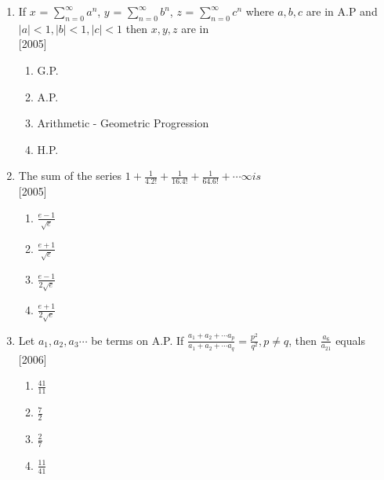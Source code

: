 \documentclass[journal,12pt,twocolumn]{IEEEtran}
\theoremstyle{remark}
\begin{document}
\begin{enumerate}[label={\arabic*.}]
\item {If $x$ = $\sum\limits_{n=0}^{\infty}a^n$, $y$ = $\sum\limits_{n=0}^{\infty}b^n$, $z$ = $\sum\limits_{n=0}^{\infty}c^n$ where $a,b,c$ are in A.P and $|a|<1,|b|<1,|c|<1$ then $x,y,z$ are in}\\ \hfill{[2005]}
\begin{enumerate}[label={(\alph*)}]
\item  {G.P.}
\item  {A.P.}
\item  {Arithmetic - Geometric Progression}
\item  {H.P.}
\end{enumerate}

\item {The sum of the series $1+\frac{1}{4.2!}+\frac{1}{16.4!}+\frac{1}{64.6!}+\cdots \infty is$}\\ \hfill{[2005]}
\begin{enumerate}[label={(\alph*)}]
\item  {$\frac{e-1}{\sqrt{e}}$}
\item  {$\frac{e+1}{\sqrt{e}}$}
\item  {$\frac{e-1}{2\sqrt{e}}$}
\item  {$\frac{e+1}{2\sqrt{e}}$}
\end{enumerate}

\item {Let $a_1, a_2, a_3 \cdots$ be terms on A.P. If $\frac{a_1+a_2+\cdots a_p}{a_1+a_2+\cdots a_q}= \frac{p^2}{q^2},p \neq q$, then $\frac{a_6}{a_{21}}$ equals}\\ \hfill{[2006]}
\begin{enumerate}[label={(\alph*)}]
\item  {$\frac{41}{11}$}
\item  {$\frac{7}{2}$}
\item  {$\frac{2}{7}$}
\item  {$\frac{11}{41}$}
\end{enumerate}




\end{enumerate}
\end{document}
